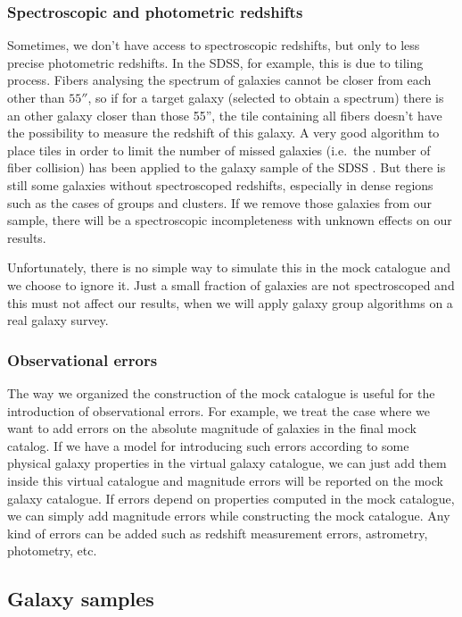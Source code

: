 \subsubsection{Spectroscopic and photometric redshifts}

Sometimes, we don't have access to spectroscopic redshifts, but only to less
precise photometric redshifts. In the SDSS, for example, this is due to tiling
process. Fibers analysing the spectrum of galaxies cannot be closer from each
other than $55''$, so if for a target galaxy (selected to obtain a spectrum)
there is an other galaxy closer than those 55'', the tile containing all fibers
doesn't have the possibility to measure the redshift of this galaxy. A very
good algorithm to place tiles in order to limit the number of missed galaxies
(i.e.\ the number of fiber collision) has been applied to the galaxy sample of
the SDSS \citep{Blanton+03}. But there is still some galaxies without
spectroscoped redshifts, especially in dense regions such as the cases of
groups and clusters. If we remove those galaxies from our sample, there
will be a spectroscopic incompleteness with unknown effects on our results.

Unfortunately, there is no simple way to simulate this in the mock catalogue
and we choose to ignore it. Just a small fraction of galaxies are not
spectroscoped and this must not affect our results, when we will apply galaxy
group algorithms on a real galaxy survey.

\subsubsection{Observational errors}

The way we organized the construction of the mock catalogue is useful for the
introduction of observational errors. For example, we treat the case where we
want to add errors on the absolute magnitude of galaxies in the final mock
catalog. If we have a model for introducing such errors according to some
physical galaxy properties in the virtual galaxy catalogue, we can just add
them inside this virtual catalogue and magnitude errors will be reported on the
mock galaxy catalogue. If errors depend on properties computed in the mock
catalogue, we can simply add magnitude errors while constructing the mock
catalogue. Any kind of errors can be added such as redshift measurement errors,
astrometry, photometry, etc.

\subsection{Galaxy samples}
\label{sub:galaxy_samples}

